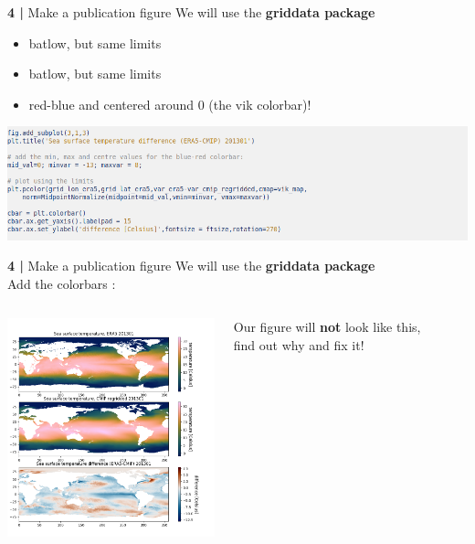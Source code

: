 \begin{frame}{\textbf{4 |} Make a publication figure} 
    We will use the \textbf{griddata package}\\
        \vspace{0.3cm} 
    \begin{itemize}
        \item batlow, but same limits
        \item batlow, but same limits
        \item red-blue and centered around 0 (the vik colorbar)! 
    \end{itemize}
    \includegraphics[scale=0.35]{images/Script5_step8.png}
\end{frame}


\begin{frame}{\textbf{4 |} Make a publication figure} 
    We will use the \textbf{griddata package}\\
        \vspace{0.3cm} 
    Add the colorbars : \\
    \begin{columns}
        \column[c]{6.5cm}
            \includegraphics[width=6cm]{images/script5_fig4.png}
        \column[c]{6.5cm}
            \begin{beamerboxesrounded}[lower=gray,shadow=true]{
                Our figure will \textbf{not} look like this,\\
                find out why and fix it!}
            \end{beamerboxesrounded}
    \end{columns}
\end{frame}


